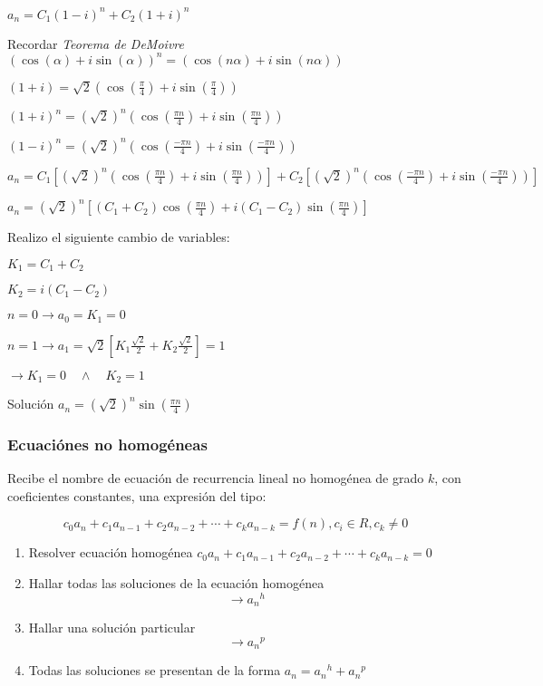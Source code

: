 \documentclass[a4paper, twoside]{article}
\begin{document}
\begin{itemize}
	$a_n= C_1 (1-i)^n + C_2 (1+i)^n$
	
	Recordar \emph{Teorema de DeMoivre} $( \cos(\alpha) + i \sin( \alpha))^n = ( \cos(n \alpha) + i \sin(n \alpha))$
	
	$(1+i) = \sqrt{2} \left(\cos(\frac{\pi}{4}) + i \sin(\frac{\pi}{4}) \right)$
	
	$(1+i)^n = (\sqrt{2})^n \left(\cos(\frac{\pi n}{4}) + i \sin(\frac{\pi n}{4}) \right)$
	
	$(1-i)^n = (\sqrt{2})^n \left(\cos(\frac{ - \pi n}{4}) + i \sin(\frac{- \pi n}{4}) \right)$
	
	$a_n = C_1 \left[(\sqrt{2})^n \left(\cos(\frac{\pi n}{4}) + i \sin(\frac{\pi n}{4}) \right) \right] + C_2 \left[ (\sqrt{2})^n \left(\cos(\frac{ - \pi n}{4}) + i \sin(\frac{- \pi n}{4}) \right)\right]$ 

	$a_n = (\sqrt{2})^n \left[ (C_1 + C_2) \cos(\frac{\pi n}{4}) + i (C_1 - C_2) \sin(\frac{\pi n}{4}) \right]$

	Realizo el siguiente cambio de variables:
	
	$K_1 = C_1 + C_2$
	
	$K_2 = i (C_1 - C_2)$
	
	$n=0 \rightarrow a_0 = K_1 = 0$
	
	$n=1 \rightarrow a_1 = \sqrt{2} \left[K_1 \frac{\sqrt{2}}{2} + K_2 \frac{\sqrt{2}}{2}\right] = 1$
	
	$\rightarrow K_1 = 0 \quad \wedge \quad K_2 =1$
	
	Solución $a_n = (\sqrt{2})^n \sin(\frac{\pi n}{4})$
\end{itemize}

\subsubsection{Ecuaciónes no homogéneas}
Recibe el nombre de ecuación de recurrencia lineal no homogénea de grado $k$, con coeficientes constantes, una expresión del tipo:

\begin{equation*}
	c_0a_n + c_1a_{n-1} + c_2a_{n-2} +\cdots+ c_ka_{n-k} =f(n) , c_i\in R , c_k \ne 0
\end{equation*}

\begin{enumerate}
	\item Resolver ecuación homogénea $c_0a_n + c_1a_{n-1} + c_2a_{n-2} +\cdots+ c_ka_{n-k} =0$
	\item Hallar todas las soluciones de la ecuación homogénea
		\begin{equation*}
			\rightarrow {a_n}^h
		\end{equation*}
	\item Hallar una solución particular
		\begin{equation*}
			\rightarrow {a_n}^p
		\end{equation*}
	\item Todas las soluciones se presentan de la forma $a_n = {a_n}^h + {a_n}^p$
\end{enumerate}
\end{document}
